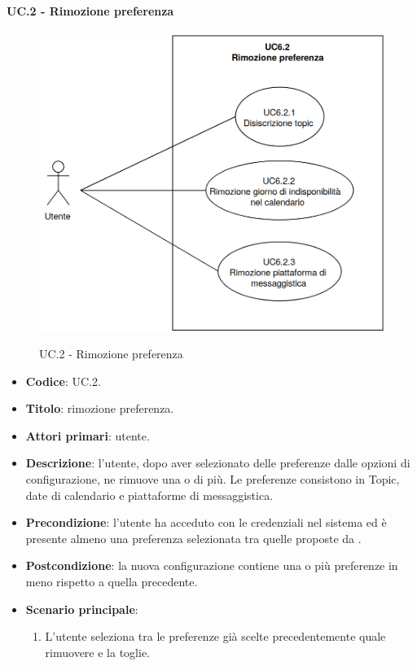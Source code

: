 	\paragraph{UC\theuccount.2 - Rimozione preferenza}
		\begin{figure}[H]
			\centering
			\includegraphics[width=\columnwidth]{img/UC6_2.png}\\
			\caption{UC\theuccount.2 - Rimozione preferenza}
		\end{figure}
	\begin{itemize}
		\item \textbf{Codice}: UC\theuccount.2.
		\item \textbf{Titolo}: rimozione preferenza.
		\item \textbf{Attori primari}: utente.
		\item \textbf{Descrizione}: l'utente, dopo aver selezionato delle preferenze dalle opzioni di configurazione, ne rimuove una o di più. Le preferenze consistono in Topic, date di calendario e piattaforme di messaggistica.
		\item \textbf{Precondizione}: l'utente ha acceduto con le credenziali nel sistema ed è presente almeno una preferenza selezionata tra quelle proposte da \progetto.
		\item \textbf{Postcondizione}: la nuova configurazione contiene una o più preferenze in meno rispetto a quella precedente.
		\item \textbf{Scenario principale}:
		\begin{enumerate}
			\item L'utente seleziona tra le preferenze già scelte precedentemente quale rimuovere e la toglie.
		\end{enumerate}
	\end{itemize}
	
